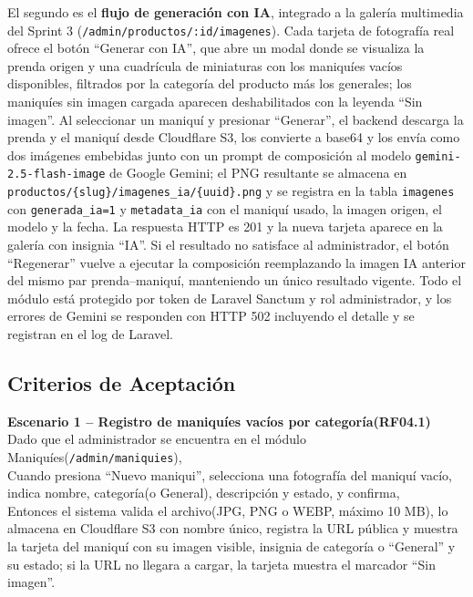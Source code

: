 \documentclass[12pt,a4paper]{article}
\begin{document}
El segundo es el \textbf{flujo de generación con IA}, integrado a la galería multimedia del Sprint 3 (\texttt{/admin/productos/:id/imagenes}). Cada tarjeta de fotografía real ofrece el botón ``Generar con IA'', que abre un modal donde se visualiza la prenda origen y una cuadrícula de miniaturas con los maniquíes vacíos disponibles, filtrados por la categoría del producto más los generales; los maniquíes sin imagen cargada aparecen deshabilitados con la leyenda ``Sin imagen''. Al seleccionar un maniquí y presionar ``Generar'', el backend descarga la prenda y el maniquí desde Cloudflare S3, los convierte a base64 y los envía como dos imágenes embebidas junto con un prompt de composición al modelo \texttt{gemini-2.5-flash-image} de Google Gemini; el PNG resultante se almacena en \texttt{productos/\{slug\}/imagenes\_ia/\{uuid\}.png} y se registra en la tabla \texttt{imagenes} con \texttt{generada\_ia=1} y \texttt{metadata\_ia} con el maniquí usado, la imagen origen, el modelo y la fecha. La respuesta HTTP es 201 y la nueva tarjeta aparece en la galería con insignia ``IA''. Si el resultado no satisface al administrador, el botón ``Regenerar'' vuelve a ejecutar la composición reemplazando la imagen IA anterior del mismo par prenda--maniquí, manteniendo un único resultado vigente. Todo el módulo está protegido por token de Laravel Sanctum y rol administrador, y los errores de Gemini se responden con HTTP 502 incluyendo el detalle y se registran en el log de Laravel.

\subsection*{Criterios de Aceptación}

\textbf{Escenario 1 -- Registro de maniquíes vacíos por categoría(RF04.1)}\\
Dado que el administrador se encuentra en el módulo Maniquíes(\texttt{/admin/maniquies}),\\
Cuando presiona ``Nuevo maniqui'', selecciona una fotografía del maniquí vacío, indica nombre, categoría(o General), descripción y estado, y confirma,\\
Entonces el sistema valida el archivo(JPG, PNG o WEBP, máximo 10 MB), lo almacena en Cloudflare S3 con nombre único, registra la URL pública y muestra la tarjeta del maniquí con su imagen visible, insignia de categoría o ``General'' y su estado; si la URL no llegara a cargar, la tarjeta muestra el marcador ``Sin imagen''.
\end{document}
